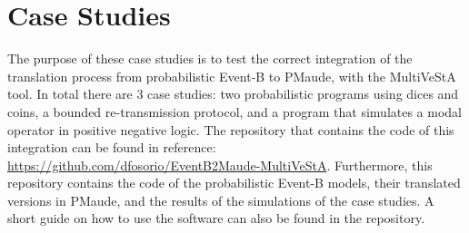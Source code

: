 \chapter{Case Studies}


The purpose of these case studies is to test the correct integration of the translation process from probabilistic Event-B to PMaude, with the MultiVeStA tool. In total there are 3 case studies: two probabilistic programs using dices and coins, a bounded re-transmission protocol, and a program that simulates a modal operator in positive negative logic. The repository that contains the code of this integration can be found in reference: \url{https://github.com/dfosorio/EventB2Maude-MultiVeStA}. Furthermore, this repository contains the code of the probabilistic Event-B models, their translated versions in PMaude, and the results of the simulations of the case studies. A short guide on how to use the software can also be found in the repository.



